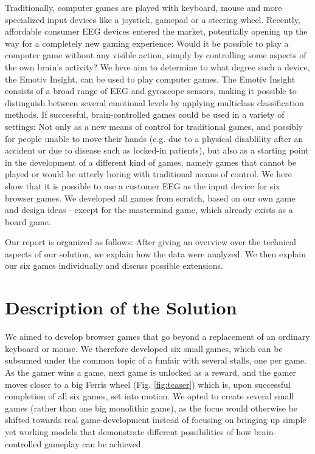 \documentclass{utue} %
\begin{document}
Traditionally, computer games are played with keyboard, mouse and more specialized input devices like a joystick, gamepad or a steering wheel. Recently, affordable consumer EEG devices entered the market, potentially opening up the way for a completely new gaming experience: Would it be possible to play a computer game without any visible action, simply by controlling some aspects of the own brain's activity? We here aim to determine to what degree such a device, the Emotiv Insight, can be used to play computer games. The Emotiv Insight consists of a broad range of EEG and gyroscope sensors, making it possible to distinguish between several emotional levels by applying multiclass classification methods. If successful, brain-controlled games could be used in a variety of settings: Not only as a new means of control for traditional games, and possibly for people unable to move their hands (e.g. due to a physical disablility after an accident or due to disease such as locked-in patients), but also as a starting point in the development of a different kind of games, namely games that cannot be played or would be utterly boring with traditional means of control. We here show that it is possible to use a customer EEG as the input device for six browser games. We developed all games from scratch, based on our own game and design ideas - except for the mastermind game, which already exists as a board game.

Our report is organized as follows: After giving an overview over the technical aspects of our solution, we explain how the data were analyzed. We then explain our six games individually and discuss possible extensions.

\section{Description of the Solution}
We aimed to develop browser games that go beyond a replacement of an ordinary keyboard or mouse. We therefore developed six small games, which can be subsumed under the common topic of a funfair with several stalls, one per game. As the gamer wins a game, next game is unlocked as a reward, and the gamer moves closer to a big Ferris wheel (Fig. \ref{fig:teaser}) which is, upon successful completion of all six games, set into motion. We opted to create several small games (rather than one big monolithic game), as the focus would otherwise be shifted towards real game-development instead of focusing on bringing up simple yet working models that demonstrate different possibilities of how brain-controlled gameplay can be achieved.
\end{document}
